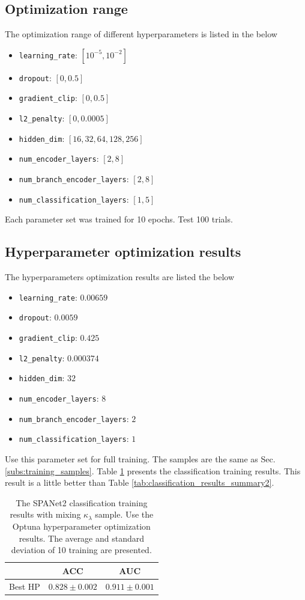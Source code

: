 \documentclass[12pt]{article}
\begin{document}
	\subsection{Optimization range}%
	\label{sub:optimization_range}
		The optimization range of different hyperparameters is listed in the below
		\begin{itemize}
			\item \verb+learning_rate+: $[10^{-5}, 10^{-2}]$ 
			\item \verb+dropout+: $[0, 0.5]$ 
			\item \verb+gradient_clip+: $[0, 0.5]$ 
			\item \verb+l2_penalty+: $[0, 0.0005]$ 
			\item \verb+hidden_dim+: $[16,32,64,128,256]$ 
			\item \verb+num_encoder_layers+: $[2,8]$ 
			\item \verb+num_branch_encoder_layers+: $[2,8]$ 
			\item \verb+num_classification_layers+: $[1,5]$ 
		\end{itemize}
		Each parameter set was trained for 10 epochs. Test 100 trials.
	\subsection{Hyperparameter optimization results}%
	\label{sub:hyperparameter_optimization_results}
		The hyperparameters optimization results are listed the below
		\begin{itemize}
			\item \verb+learning_rate+: $0.00659$ 
			\item \verb+dropout+: $0.0059$ 
			\item \verb+gradient_clip+: $0.425$ 
			\item \verb+l2_penalty+: $0.000374$ 
			\item \verb+hidden_dim+: $32$ 
			\item \verb+num_encoder_layers+: $8$ 
			\item \verb+num_branch_encoder_layers+: $2$ 
			\item \verb+num_classification_layers+: $1$ 
		\end{itemize}

		Use this parameter set for full training. The samples are the same as Sec. \ref{subs:training_samples}. Table \ref{tab:SPANET_best_hp_cls_results} presents the classification training results. This result is a little better than Table \ref{tab:classification_results_summary2}.
	\begin{table}[htpb]
		\centering
		\caption{The SPANet2 classification training results with mixing $\kappa_\lambda$ sample. Use the Optuna hyperparameter optimization results. The average and standard deviation of 10 training are presented.}
		\label{tab:SPANET_best_hp_cls_results}
		\begin{tabular}{c|cc}
		& ACC     & AUC   \\ \hline
		Best HP & $0.828 \pm 0.002$ & $0.911 \pm 0.001$
		\end{tabular}      
	\end{table}
\end{document}
